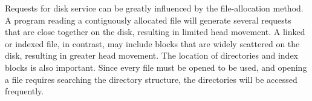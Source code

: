 Requests for disk service can be greatly influenced by the file-allocation method.
A program reading a contiguously allocated file will generate several requests that are close together on the disk, resulting in limited head movement.
A linked or indexed file, in contrast, may include blocks that are widely scattered on the disk, resulting in greater head movement.
The location of directories and index blocks is also important.
Since every file must be opened to be used, and opening a file requires searching the directory structure, the directories will be accessed frequently.


